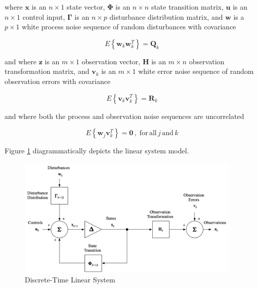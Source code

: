\documentclass[12pt]{article}
\begin{document}
where $\mathbf{x}$ is an $n \times 1$ state vector,
$\mathbf{\Phi}$ is an $n \times n$ state transition matrix,
$\mathbf{u}$ is an $n \times 1$ control input,
$\mathbf{\Gamma}$ is an $n \times p$ disturbance distribution matrix,
and $\mathbf{w}$ is a $p \times 1$ white process noise sequence of random disturbances with covariance

\begin{equation*}
    E \left\{ \mathbf{w}_k \mathbf{w}_k^T \right\} = \mathbf{Q}_k
\end{equation*}

and where $\mathbf{z}$ is an $m \times 1$ observation vector,
$\mathbf{H}$ is an $m \times n$ observation transformation matrix,
and $\mathbf{v}_k$ is an $m \times 1$ white error noise sequence of random observation errors with covariance

\begin{equation*}
    E \left\{ \mathbf{v}_k \mathbf{v}_k^T \right\} = \mathbf{R}_k
\end{equation*}

and where both the process and observation noise sequences are uncorrelated

\begin{equation*}
    E \left\{ \mathbf{w}_j \mathbf{v}_k^T \right\} = \mathbf{0} \, , \phantom{.} \mathrm{for} \, \mathrm{all} \, j \, \mathrm{and} \, k
\end{equation*}

Figure \ref{fig:dt-linear-system} diagrammatically depicts the linear system model.

\begin{figure}[ht]
    \centering
    \includegraphics[width=0.95\textwidth]{images/DT-Linear-System.png}
    \caption{Discrete-Time Linear System}
    \label{fig:dt-linear-system}
\end{figure}
\end{document}
